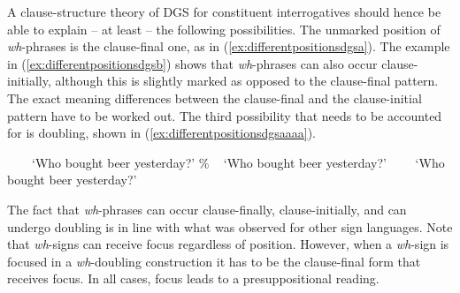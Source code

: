 A clause-structure theory of DGS %
for constituent interrogatives should hence be able to explain -- at least -- the following possibilities. The unmarked position of \textit{wh}-phrases is the clause-final one, as in (\ref{ex:differentpositionsdgsa}). The example in (\ref{ex:differentpositionsdgsb}) shows that \textit{wh}-phrases can also occur clause-initially, although this is slightly marked as opposed to the clause-final pattern. The exact meaning differences between the clause-final and the clause-initial pattern have to be worked out. The third possibility that needs to be accounted for is doubling, shown in (\ref{ex:differentpositionsdgsaaaa}).

\begin{exe}
\ex\label{differentpositionsdgs}
\begin{xlist}
\ex \textcolor{white}{\%}
%
\glt \textcolor{white}{\%}`Who bought beer yesterday?' \label{ex:differentpositionsdgsa}
\ex \%
%
\glt \textcolor{white}{\%}`Who bought beer yesterday?' \label{ex:differentpositionsdgsb}
\ex \textcolor{white}{\%}
%
\glt \textcolor{white}{\%}`Who bought beer yesterday?' \label{ex:differentpositionsdgsaaaa}
\end{xlist}
\end{exe}

\noindent The fact that \textit{wh}-phrases can occur clause-finally, clause-initially, and can undergo doubling is in line with what was observed for other sign languages. Note that \textit{wh}-signs can receive focus regardless of position. However, when a \textit{wh}-sign is focused in a \textit{wh}-doubling construction it has to be the clause-final form that receives focus. In all cases, focus leads to a presuppositional reading.

